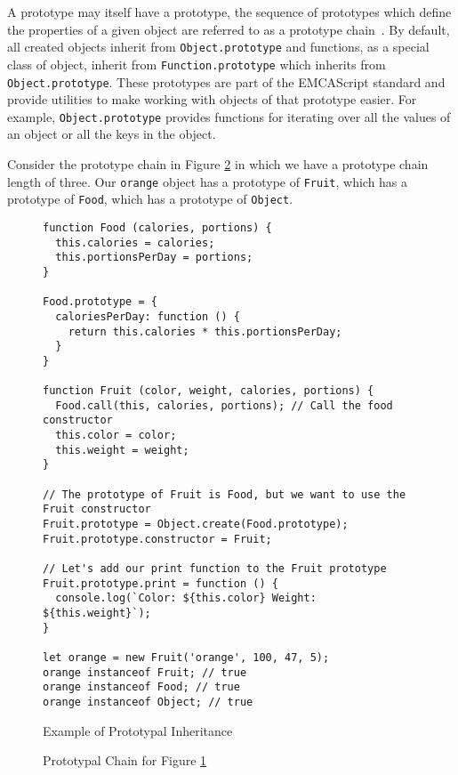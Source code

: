 \documentclass[]{final_report}
\begin{document}
A prototype may itself have a prototype, the sequence of prototypes which define the properties of a given object are referred to as a prototype chain~\cite{EcmaScript, borning1986classes}. By default, all created objects inherit from \lstinline{Object.prototype} and functions, as a special class of object, inherit from \lstinline{Function.prototype} which inherits from \lstinline{Object.prototype}. These prototypes are part of the EMCAScript standard and provide utilities to make working with objects of that prototype easier. For example, \lstinline{Object.prototype} provides functions for iterating over all the values of an object or all the keys in the object.

Consider the prototype chain in Figure \ref{fig:js-prototypal-chain} in which we have a prototype chain length of three. Our \lstinline{orange} object has a prototype of \lstinline{Fruit}, which has a prototype of \lstinline{Food}, which has a prototype of \lstinline{Object}.


\begin{figure}[t]
\begin{lstlisting}
function Food (calories, portions) {
  this.calories = calories;
  this.portionsPerDay = portions;
}

Food.prototype = {
  caloriesPerDay: function () {
    return this.calories * this.portionsPerDay;
  }
}

function Fruit (color, weight, calories, portions) {
  Food.call(this, calories, portions); // Call the food constructor
  this.color = color;
  this.weight = weight;
}

// The prototype of Fruit is Food, but we want to use the Fruit constructor
Fruit.prototype = Object.create(Food.prototype);
Fruit.prototype.constructor = Fruit;

// Let's add our print function to the Fruit prototype
Fruit.prototype.print = function () {
  console.log(`Color: ${this.color} Weight: ${this.weight}`);
}

let orange = new Fruit('orange', 100, 47, 5);
orange instanceof Fruit; // true
orange instanceof Food; // true
orange instanceof Object; // true
\end{lstlisting}
\caption{\label{fig:js-prototypal-inheritance} Example of Prototypal Inheritance}
\end{figure} 

\begin{figure}[t]
\centering
\fboxsep 2mm
\caption{\label{fig:js-prototypal-chain} Prototypal Chain for Figure \ref{fig:js-prototypal-inheritance}}
\end{figure} 
\end{document}
